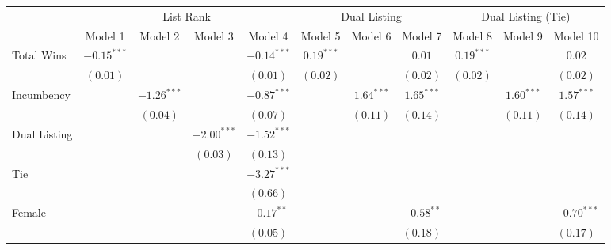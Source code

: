 
\begin{table}
\begin{center}
\begin{tabular}{l c c c c c c c c c c}
\hline
 & \multicolumn{4}{c}{List Rank} & \multicolumn{3}{c}{Dual Listing} & \multicolumn{3}{c}{Dual Listing (Tie)} \\
\cline{2-5} \cline{6-8} \cline{9-11}
 & Model 1 & Model 2 & Model 3 & Model 4 & Model 5 & Model 6 & Model 7 & Model 8 & Model 9 & Model 10 \\
\hline
Total Wins         & $-0.15^{***}$ &               &               & $-0.14^{***}$ & $0.19^{***}$ &              & $0.01$       & $0.19^{***}$ &              & $0.02$        \\
                   & $(0.01)$      &               &               & $(0.01)$      & $(0.02)$     &              & $(0.02)$     & $(0.02)$     &              & $(0.02)$      \\
Incumbency         &               & $-1.26^{***}$ &               & $-0.87^{***}$ &              & $1.64^{***}$ & $1.65^{***}$ &              & $1.60^{***}$ & $1.57^{***}$  \\
                   &               & $(0.04)$      &               & $(0.07)$      &              & $(0.11)$     & $(0.14)$     &              & $(0.11)$     & $(0.14)$      \\
Dual Listing       &               &               & $-2.00^{***}$ & $-1.52^{***}$ &              &              &              &              &              &               \\
                   &               &               & $(0.03)$      & $(0.13)$      &              &              &              &              &              &               \\
Tie                &               &               &               & $-3.27^{***}$ &              &              &              &              &              &               \\
                   &               &               &               & $(0.66)$      &              &              &              &              &              &               \\
Female             &               &               &               & $-0.17^{**}$  &              &              & $-0.58^{**}$ &              &              & $-0.70^{***}$ \\
                   &               &               &               & $(0.05)$      &              &              & $(0.18)$     &              &              & $(0.17)$      \\

\end{tabular}
\end{center}
\end{table}
